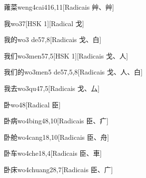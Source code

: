\begin{entry}{蕹菜}{weng4cai4}{16,11}[Radicais ⾋、⾋]
\end{entry}

\begin{entry}{我}{wo3}{7}[HSK 1][Radical ⼽]
\end{entry}

\begin{entry}{我的}{wo3 de5}{7,8}[Radicais ⼽、⽩]
\end{entry}

\begin{entry}{我们}{wo3men5}{7,5}[HSK 1][Radicais ⼽、⼈]
\end{entry}

\begin{entry}{我们的}{wo3men5 de5}{7,5,8}[Radicais ⼽、⼈、⽩]
\end{entry}

\begin{entry}{我去}{wo3qu4}{7,5}[Radicais ⼽、⼛]
\end{entry}

\begin{entry}{卧}{wo4}{8}[Radical ⾂]
\end{entry}

\begin{entry}{卧病}{wo4bing4}{8,10}[Radicais ⾂、⽧]
\end{entry}

\begin{entry}{卧舱}{wo4cang1}{8,10}[Radicais ⾂、⾈]
\end{entry}

\begin{entry}{卧车}{wo4che1}{8,4}[Radicais ⾂、⾞]
\end{entry}

\begin{entry}{卧床}{wo4chuang2}{8,7}[Radicais ⾂、⼴]
\end{entry}

